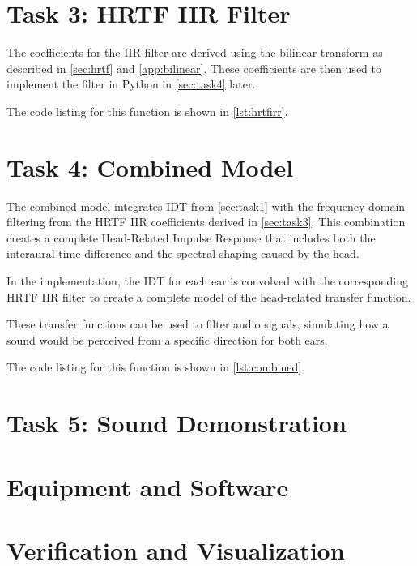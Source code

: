 \section{Task 3: HRTF IIR Filter}
\label{sec:task3}

The coefficients for the IIR filter are derived using the bilinear transform as described in \autoref{sec:hrtf} and \autoref{app:bilinear}. These coefficients are then used to implement the filter in Python in \autoref{sec:task4} later.

The code listing for this function is shown in \autoref{lst:hrtfirr}.

\section{Task 4: Combined Model}
\label{sec:task4}

The combined model integrates IDT from \autoref{sec:task1} with the frequency-domain filtering from the HRTF IIR coefficients derived in \autoref{sec:task3}. This combination creates a complete Head-Related Impulse Response that includes both the interaural time difference and the spectral shaping caused by the head.

In the implementation, the IDT for each ear is convolved with the corresponding HRTF IIR filter to create a complete model of the head-related transfer function.

These transfer functions can be used to filter audio signals, simulating how a sound would be perceived from a specific direction for both ears.

The code listing for this function is shown in \autoref{lst:combined}.

\section{Task 5: Sound Demonstration}




\section{Equipment and Software}
\section{Verification and Visualization}

